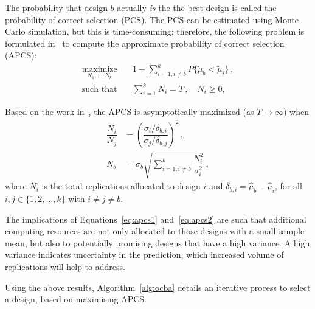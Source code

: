 The probability that design $b$ actually \emph{is} the the best design is called the probability of correct selection (PCS).
The PCS can be estimated using Monte Carlo simulation, but this is time-consuming; therefore, the following problem is formulated in~\cite{chen2011stochastic} to compute the approximate probability of correct selection (APCS):
\begin{align}
\underset{N_1,\dots,N_k}{\text{maximize}}&\quad 1 - \displaystyle\sum^k_{i=1,i\neq b}P\{\tilde\mu_b < \tilde\mu_i\}\,,\nonumber\\
\text{such that}& \quad \displaystyle\sum^k_{i=1}N_i = T\,, \quad N_i \geq 0,
\end{align}

Based on the work in~\cite{chen2011stochastic}, the APCS is asymptotically maximized (as $T \to \infty$) when
\begin{align}
\dfrac{N_i}{N_j} &= \left(\dfrac{\sigma_i/\delta_{b,i}}{\sigma_j/\delta_{b,j}}\right)^2\,,\label{eq:apcs1}\\[0.2cm]
N_b &= \sigma_b \sqrt{\displaystyle\sum^k_{i=1,i\neq b}\dfrac{N_i^2}{\sigma_i^2}}\,,\label{eq:apcs2}
\end{align}
where $N_i$ is the total replications allocated to design $i$ and $\delta_{b,i} = \hat{\mu}_b - \hat{\mu}_i$, for all $i,j\in \{1,2,\dots,k\}$ with $i \neq j \neq b$.

The implications of Equations~\ref{eq:apcs1} and~\ref{eq:apcs2} are such that additional computing resources are not only allocated to those designs with a small sample mean, but also to potentially promising designs that have a high variance. A high variance indicates uncertainty in the prediction, which increased volume of replications will help to address.

Using the above results, Algorithm~\ref{alg:ocba} details an iterative process to select a design, based on maximising APCS.


